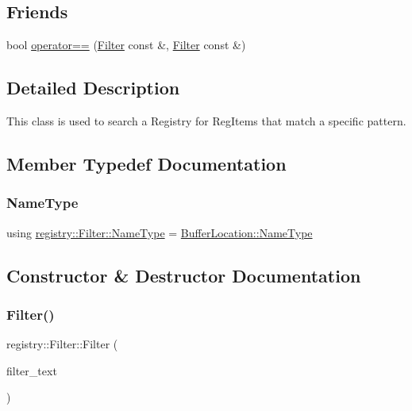 \subsection*{Friends}
\begin{DoxyCompactItemize}
\item 
bool \hyperlink{classregistry_1_1Filter_a2258c07ccd7708c4f4cad83338a14c4d}{operator==} (\hyperlink{classregistry_1_1Filter}{Filter} const \&, \hyperlink{classregistry_1_1Filter}{Filter} const \&)
\end{DoxyCompactItemize}


\subsection{Detailed Description}
This class is used to search a Registry for Reg\+Items that match a specific pattern. 

\subsection{Member Typedef Documentation}
\mbox{\label{classregistry_1_1Filter_adca74845d8a5adb325dea6fb17dbcb2e}} 
\subsubsection{\texorpdfstring{Name\+Type}{NameType}}
{\footnotesize\ttfamily using \hyperlink{classregistry_1_1Filter_adca74845d8a5adb325dea6fb17dbcb2e}{registry\+::\+Filter\+::\+Name\+Type} =  \hyperlink{structregistry_1_1BufferLocation_ad3c2279012b74798fa1e348507020fa4}{Buffer\+Location\+::\+Name\+Type}\hspace{0.3cm}{\ttfamily [private]}}



\subsection{Constructor \& Destructor Documentation}
\mbox{\label{classregistry_1_1Filter_a91fa4858a3facd5ae4f302426ec0c126}} 
\subsubsection{\texorpdfstring{Filter()}{Filter()}\hspace{0.1cm}{\footnotesize\ttfamily [1/2]}}
{\footnotesize\ttfamily registry\+::\+Filter\+::\+Filter (\begin{DoxyParamCaption}\item[{\hyperlink{classregistry_1_1Filter_adca74845d8a5adb325dea6fb17dbcb2e}{Name\+Type} const \&}]{filter\+\_\+text }\end{DoxyParamCaption})\hspace{0.3cm}{\ttfamily [inline]}}

